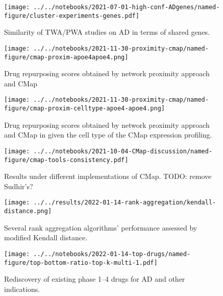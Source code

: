 \documentclass[letterpaper]{article}
\begin{document}
\begin{figure}
\texttt{[image: ../../notebooks/2021-07-01-high-conf-ADgenes/named-figure/cluster-experiments-genes.pdf]}
\caption{
Similarity of TWA/PWA studies on AD in terms of shared genes.
}
\label{fig:twas-clustermap}
\end{figure}

\begin{figure}[p]
\texttt{[image: ../../notebooks/2021-11-30-proximity-cmap/named-figure/cmap-proxim-apoe4apoe4.png]}
\caption{
Drug repurposing scores obtained by network proximity approach and CMap
}
\label{fig:proxim-cmap}
\end{figure}

\begin{figure}[p]
\texttt{[image: ../../notebooks/2021-11-30-proximity-cmap/named-figure/cmap-proxim-celltype-apoe4-apoe4.png]}
\caption{
Drug repurposing scores obtained by network proximity approach and CMap in
given the cell type of the CMap expression profiling.
}
\label{fig:proxim-cmap-celltype}
\end{figure}

\begin{figure}[p]
\texttt{[image: ../../notebooks/2021-10-04-CMap-discussion/named-figure/cmap-tools-consistency.pdf]}
\caption{
Results under different implementations of CMap.
TODO: remove Sudhir's?
}
\label{fig:cmap-cmap}
\end{figure}

\begin{figure}[p]
\texttt{[image: ../../results/2022-01-14-rank-aggregation/kendall-distance.png]}
\caption{
Several rank aggregation algorithms' performance assessed by modified Kendall
distance.
}
\label{fig:kendall-dist}
\end{figure}

\begin{figure}[p]
\texttt{[image: ../../notebooks/2022-01-14-top-drugs/named-figure/top-bottom-ratio-top-k-multi-1.pdf]}
\caption{
Rediscovery of existing phase 1--4 drugs for AD and other indications.
}
\label{fig:ad-drug-rediscovery-multi}
\end{figure}
\end{document}
